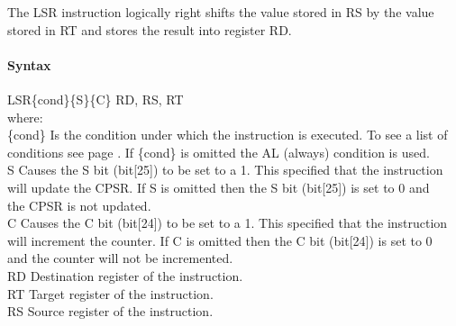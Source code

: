 \documentclass[12pt]{article}
\begin{document}
    \noindent
    The LSR instruction logically right shifts the value stored in RS by the value stored in RT and stores the result into register RD. 
    
    \paragraph{Syntax}
    \begin{flushleft}
    LSR\{cond\}\{S\}\{C\} RD, RS, RT\\
    \vspace{1em}        %
    where:\\
    \vspace{1em}
    \{cond\}    \hspace{2em} Is the condition under which the instruction is executed. To see a list of\\
                \hspace{5.4em} conditions see page . If \{cond\} is omitted the AL (always) condition is used.\\
    \vspace{1em}    
    S       \hspace{4.5em} Causes the S bit (bit[25]) to be set to a 1. This specified that the instruction\\
            \hspace{5.4em} will update the CPSR. If S is omitted then the S bit (bit[25]) is set to 0 and\\
            \hspace{5.4em} the CPSR is not updated.\\
    \vspace{1em}    
    C       \hspace{4.5em} Causes the C bit (bit[24]) to be set to a 1. This specified that the instruction\\
            \hspace{5.4em} will increment the counter. If C is omitted then the C bit (bit[24]) is set to 0\\
            \hspace{5.4em} and the counter will not be incremented.\\
    \vspace{1em}
    RD  \hspace{3.6em} Destination register of the instruction.\\
    \vspace{1em}
    RT  \hspace{3.7em} Target register of the instruction.\\
    \vspace{1em}
    RS  \hspace{3.85em} Source register of the instruction.\\
    \end{flushleft}
    
\end{document}
